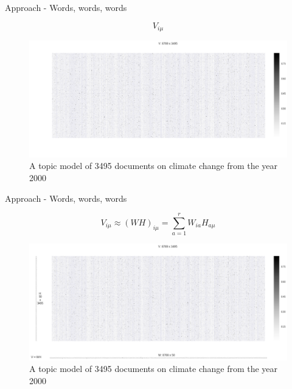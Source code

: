\documentclass[9pt]{beamer}
\begin{document}
\begin{frame}{Approach - Words, words, words}

\begin{figure}
	
	\[V_{i\mu} \]
	
	\includegraphics[width=\linewidth]{../plots/VWH_blank.png}
	
	\caption{A topic model of 3495 documents on climate change from the year 2000}
	
\end{figure}

\end{frame}


\begin{frame}{Approach - Words, words, words}

\begin{figure}
	
	\[V_{i\mu} \approx (WH)_{i\mu} = \sum_{a=1}^{r}W_{ia}H_{a\mu} \]
	
	\includegraphics[width=\linewidth]{../plots/VWH.png}
	
	\caption{A topic model of 3495 documents on climate change from the year 2000}
	
\end{figure}

\end{frame}
\end{document}
